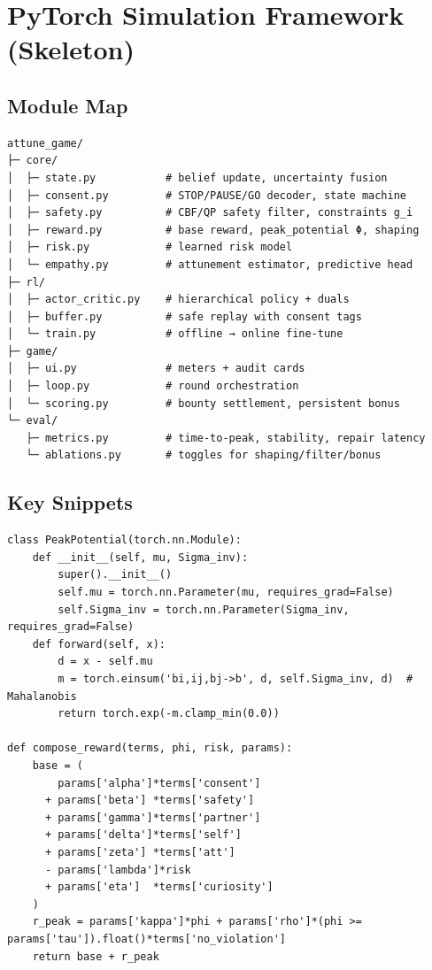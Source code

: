 \documentclass[12pt]{article}
\begin{document}
\section{PyTorch Simulation Framework (Skeleton)}
\subsection{Module Map}
\begin{verbatim}
attune_game/
├─ core/
│  ├─ state.py           # belief update, uncertainty fusion
│  ├─ consent.py         # STOP/PAUSE/GO decoder, state machine
│  ├─ safety.py          # CBF/QP safety filter, constraints g_i
│  ├─ reward.py          # base reward, peak_potential Φ, shaping
│  ├─ risk.py            # learned risk model
│  └─ empathy.py         # attunement estimator, predictive head
├─ rl/
│  ├─ actor_critic.py    # hierarchical policy + duals
│  ├─ buffer.py          # safe replay with consent tags
│  └─ train.py           # offline → online fine-tune
├─ game/
│  ├─ ui.py              # meters + audit cards
│  ├─ loop.py            # round orchestration
│  └─ scoring.py         # bounty settlement, persistent bonus
└─ eval/
   ├─ metrics.py         # time-to-peak, stability, repair latency
   └─ ablations.py       # toggles for shaping/filter/bonus
\end{verbatim}

\subsection{Key Snippets}
\begin{lstlisting}[style=code]
class PeakPotential(torch.nn.Module):
    def __init__(self, mu, Sigma_inv):
        super().__init__()
        self.mu = torch.nn.Parameter(mu, requires_grad=False)
        self.Sigma_inv = torch.nn.Parameter(Sigma_inv, requires_grad=False)
    def forward(self, x):
        d = x - self.mu
        m = torch.einsum('bi,ij,bj->b', d, self.Sigma_inv, d)  # Mahalanobis
        return torch.exp(-m.clamp_min(0.0))

def compose_reward(terms, phi, risk, params):
    base = (
        params['alpha']*terms['consent']
      + params['beta'] *terms['safety']
      + params['gamma']*terms['partner']
      + params['delta']*terms['self']
      + params['zeta'] *terms['att']
      - params['lambda']*risk
      + params['eta']  *terms['curiosity']
    )
    r_peak = params['kappa']*phi + params['rho']*(phi >= params['tau']).float()*terms['no_violation']
    return base + r_peak
\end{lstlisting}
\end{document}
